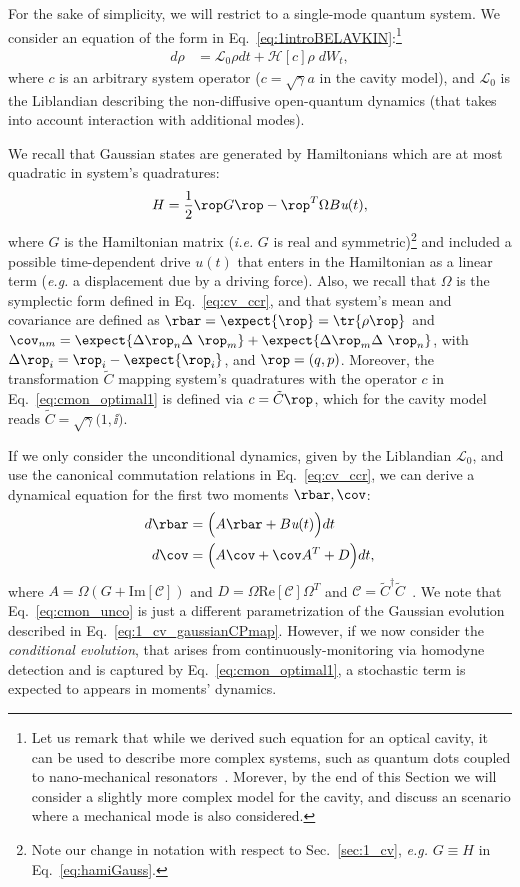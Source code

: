 For the sake of simplicity, we will restrict to a single-mode quantum system. We consider an equation of the form in Eq.~\ref{eq:1introBELAVKIN}:\footnote{Let us remark that while we derived such equation for an optical cavity, it can be used to describe more complex systems, such as quantum dots coupled to nano-mechanical resonators~\cite{wisemanbook}. Morever, by the end of this Section we will consider a slightly more complex model for the cavity, and discuss an scenario where a mechanical mode is also considered.}
\begin{align}\label{eq:cmon_optimal1}
d\rho &= \mathcal{L}_0 \rho dt + \mathcal{H}[c]\rho \; dW_t,
\end{align}
where $c$ is an arbitrary system operator ($c=\sqrt{\gamma}a$ in the cavity model), and $\mathcal{L}_0$ is the Liblandian describing the non-diffusive open-quantum dynamics (that takes into account interaction with additional modes).

We recall that Gaussian states are generated by Hamiltonians which are at most quadratic in system's quadratures:
\begin{align}
H = \frac{1}{2} \rop G \rop - \rop^T \Omega B \textit{u}(t),
\end{align}
where $G$ is the Hamiltonian matrix (\textit{i.e.} $G$ is real and symmetric)\footnote{Note our change in notation with respect to Sec.~\ref{sec:1_cv}, \textit{e.g.} $G\equiv H$ in Eq.~\ref{eq:hamiGauss}.} and included a possible time-dependent drive $\textit{u}(t)$ that enters in the Hamiltonian as a linear term (\textit{e.g.} a displacement due by a driving force). Also, we recall that $\Omega$ is the symplectic form defined in Eq.~\ref{eq:cv_ccr}, and that system's mean and covariance are defined as $\rbar = \expect{\rop} = \tr{\rho \rop}$ and $\cov_{nm} = \expect{\Delta \rop_n \Delta \rop_m} + \expect{\Delta \rop_m \Delta \rop_n}$, with $\Delta \rop_i = \rop_i - \expect{\rop_i}$, and $\rop = (q, p)$.
Moreover, the transformation $\tilde{C}$ mapping system's quadratures with the operator $c$ in Eq.~\eqref{eq:cmon_optimal1} is defined via $c = \tilde{C} \rop$, which for the cavity model reads $\tilde{C}=\sqrt{\gamma}\Big(1, \ii\Big)$.

If we only consider the unconditional dynamics, given by the Liblandian $\mathcal{L}_0$, and use the canonical commutation relations in Eq.~\ref{eq:cv_ccr}, we can derive a dynamical equation for the first two moments $\rbar, \cov$:
\begin{align}\label{eq:cmon_unco}
d \rbar &= \Big(A\rbar  + B\textit{u}(t)\Big) dt\\
d \cov &= \Big(A \cov + \cov A^T + D \Big) dt, \nonumber
\end{align}
where $A = \Omega( G + \text{Im}[\mathcal{C}])$ and $D = \Omega \text{Re}[\mathcal{C}]\Omega^T$ and $\mathcal{C} = \tilde{C}^\dagger \tilde{C}$~\cite{Wiseman2005optimal}. We note that Eq.~\ref{eq:cmon_unco} is just a different parametrization of the Gaussian evolution described in Eq.~\ref{eq:1_cv_gaussianCPmap}.
However, if we now consider the \textit{conditional evolution}, that arises from continuously-monitoring via homodyne detection and is captured by Eq.~\ref{eq:cmon_optimal1}, a stochastic term is expected to appears in moments' dynamics.

